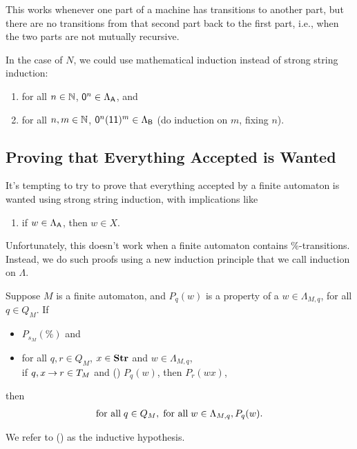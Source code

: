 This works whenever one part of a machine has transitions to
another part, but there are no transitions from that second part
back to the first part, i.e., when the two parts are not mutually
recursive.

In the case of $N$, we could use mathematical induction instead of
strong string induction:
\begin{enumerate}[\quad(A)]
\item for all $n\in\mathbb{N}$, $\mathsf{0}^n\in\Lambda_{\mathsf{A}}$, and

\item for all $n,m\in\mathbb{N}$, $\mathsf{0}^n(\mathsf{1}\mathsf{1})^m\in\Lambda_{\mathsf{B}}$
(do induction on $m$, fixing $n$).
\end{enumerate}

\subsection{Proving that Everything Accepted is Wanted}

It's tempting to try to prove that everything accepted by a finite
automaton is wanted using strong string induction, with implications
like
\begin{enumerate}[\quad(A)]
\item if $w\in\Lambda_{\mathsf{A}}$, then $w\in X$.
\end{enumerate}
Unfortunately, this doesn't work when a finite automaton contains
$\%$-transitions.  Instead, we do such proofs using a new induction
principle that we call induction on $\Lambda$.

%
\begin{theorem}
Suppose $M$ is a finite automaton, and $P_q(w)$ is a property
of a $w\in\Lambda_{M,q}$, for all $q\in Q_M$.
If
\begin{itemize}
\item $P_{s_M}(\%)$ and

\item for all $q,r\in Q_M$, $x\in\mathbf{Str}$ and $w\in\Lambda_{M,q}$,\\
if $q, x\mathbin{\to} r\in T_M$ and (\dag) $P_q(w)$, then  $P_r(wx)$,
\end{itemize}
then
\begin{gather*}
\allowbreak\mbox{for all}\allowbreak\;q\in Q_M,\;\allowbreak\mbox{for all}\allowbreak\;w\in\Lambda_{M,q}, P_q(w) .
\end{gather*}
\end{theorem}

We refer to (\dag) as the inductive hypothesis.

